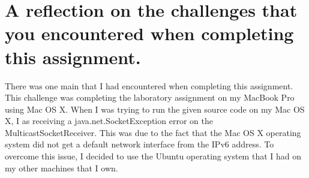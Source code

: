 \documentclass{article}
\begin{document}

% 

\section{A reflection on the challenges that you encountered when completing this assignment.}

There was one main that I had encountered when completing this assignment. This challenge was completing the laboratory assignment on my MacBook Pro using Mac OS X. When I was trying to run the given source code on my Mac OS X, I as receiving a java.net.SocketException error on the MulticastSocketReceiver. This was due to the fact that the Mac OS X operating system did not get a default network interface from the IPv6 address. To overcome this issue, I decided to use the Ubuntu operating system that I had on my other machines that I own. 


\nocite{tanenbaum_steen_2007}
\nocite{2001:IMS:380749.380771}
\nocite{Dutta:2002:MSS:570705.570717}
\nocite{datagramsocket_java_platform_se_7}
\nocite{inetaddress_java_platform_se_6}
\nocite{multicastsocket_java_platform_se_7_b123}

%


\end{document}
